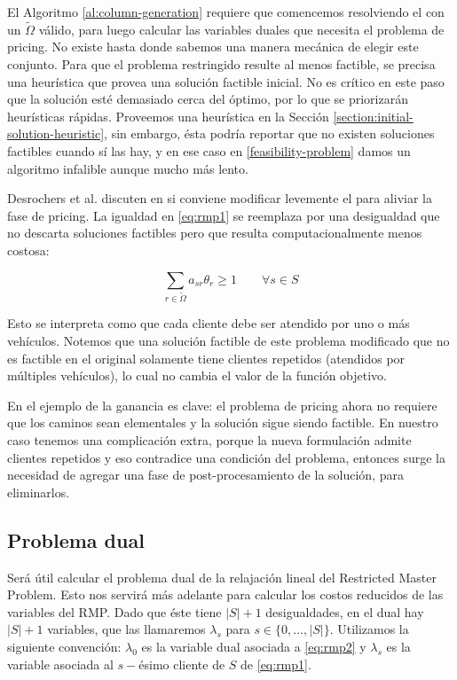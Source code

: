 El Algoritmo \ref{al:column-generation} requiere que comencemos resolviendo el  con un $\tilde{\Omega}$ válido, para luego calcular las variables duales que necesita el problema de pricing. No existe hasta donde sabemos una manera mecánica de elegir este conjunto. Para que el problema restringido resulte al menos factible, se precisa una heurística que provea una solución factible inicial. No es crítico en este paso que la solución esté demasiado cerca del óptimo, por lo que se priorizarán heurísticas rápidas. Proveemos una heurística en la Sección \ref{section:initial-solution-heuristic}, sin embargo, ésta podría reportar que no existen soluciones factibles cuando sí las hay, y en ese caso en \ref{feasibility-problem} damos un algoritmo infalible aunque mucho más lento.

Desrochers et al. discuten en \cite{desrochers1992} si conviene modificar levemente el  para aliviar la fase de pricing. La igualdad en \ref{eq:rmp1} se reemplaza por una desigualdad que no descarta soluciones factibles pero que resulta computacionalmente menos costosa:

\begin{equation}
\label{eq:ge-restriction-rmp}
     \sum_{r \in \tilde{\Omega}} {a_{sr}\theta_r} \geq 1
\qquad \forall {s \in S}
\end{equation}

Esto se interpreta como que cada cliente debe ser atendido por uno o más vehículos. Notemos que una solución factible de este problema modificado que no es factible en el original solamente tiene clientes repetidos (atendidos por múltiples vehículos), lo cual no cambia el valor de la función objetivo.

En el ejemplo de \cite{desrochers1992} la ganancia es clave: el problema de pricing ahora no requiere que los caminos sean elementales y la solución sigue siendo factible. En nuestro caso tenemos una complicación extra, porque la nueva formulación admite clientes repetidos y eso contradice una condición del problema, entonces surge la necesidad de agregar una fase de post-procesamiento de la solución, para eliminarlos.


\subsection{Problema dual}

Será útil calcular el problema dual de la relajación lineal del Restricted Master Problem. Esto nos servirá más adelante para calcular los costos reducidos de las variables del RMP. 
Dado que éste tiene $|S| + 1$ desigualdades, en el dual hay $|S| + 1$ variables, que las llamaremos $\lambda_s$ para $s \in \{0, \dots, |S|\}$. Utilizamos la siguiente convención: $\lambda_0$ es la variable dual asociada a \ref{eq:rmp2} y $\lambda_{s}$ es la variable asociada al $s-$ésimo cliente de $S$ de \ref{eq:rmp1}.
\\

